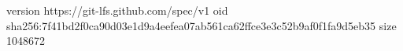 version https://git-lfs.github.com/spec/v1
oid sha256:7f41bd2f0ca90d03e1d9a4eefea07ab561ca62ffce3e3c52b9af0f1fa9d5eb35
size 1048672
